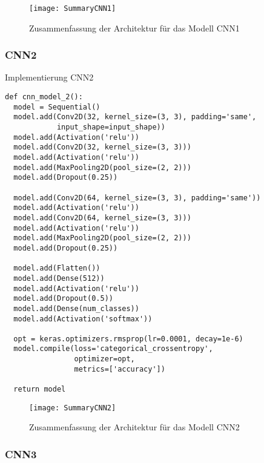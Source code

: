 \begin{figure} [H]
	\centering
	\texttt{[image: SummaryCNN1]}
	\caption{Zusammenfassung der Architektur für das Modell CNN1}
	\label{pic:summary-cnn1}
\end{figure}

\subsubsection{CNN2}

\begin{listing} [H]
	\caption{Implementierung CNN2}
	\label{lst:cnn2}
	\begin{verbatim}
def cnn_model_2():
  model = Sequential()
  model.add(Conv2D(32, kernel_size=(3, 3), padding='same',
            input_shape=input_shape))
  model.add(Activation('relu'))
  model.add(Conv2D(32, kernel_size=(3, 3)))
  model.add(Activation('relu'))
  model.add(MaxPooling2D(pool_size=(2, 2)))
  model.add(Dropout(0.25))

  model.add(Conv2D(64, kernel_size=(3, 3), padding='same'))
  model.add(Activation('relu'))
  model.add(Conv2D(64, kernel_size=(3, 3)))
  model.add(Activation('relu'))
  model.add(MaxPooling2D(pool_size=(2, 2)))
  model.add(Dropout(0.25))

  model.add(Flatten())
  model.add(Dense(512))
  model.add(Activation('relu'))
  model.add(Dropout(0.5))
  model.add(Dense(num_classes))
  model.add(Activation('softmax'))

  opt = keras.optimizers.rmsprop(lr=0.0001, decay=1e-6)
  model.compile(loss='categorical_crossentropy', 
                optimizer=opt,
                metrics=['accuracy'])

  return model
	\end{verbatim}
\end{listing} 

\begin{figure} [H]
	\centering
	\texttt{[image: SummaryCNN2]}
	\caption{Zusammenfassung der Architektur für das Modell CNN2}
	\label{pic:summary-cnn2}
\end{figure}

\subsubsection{CNN3}

